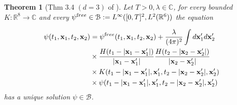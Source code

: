 \documentclass[b5paper,draft,openbib,12pt]{memoir}
\newtheorem{Thm}[Def]{Theorem}
\newcommand{\vx}{\mathbf{x}}
\newcommand{\free}{{\textup free}}
\begin{document}


\begin{Thm}[Thm 3.4 \((d=3)\) of \cite{mtve}]
Let \(T>0, \lambda\in\mathbb{C}\), for every bounded \(K:\mathbb{R}^8\rightarrow\mathbb{C}\) and every
\(\psi^\free \in\mathcal{B}:=L^\infty([0,T]^2,L^2(\mathbb{R}^6))\)
the equation 

\begin{align*}
\psi(t_1,\vx_1,t_2,\vx_2)&=\psi^\free(t_1,\vx_1,t_2,\vx_2)+\frac{\lambda}{(4\pi)^2}\int d\vx_1' d\vx_2'\\
&\times \frac{H(t_1-|\vx_1-\vx_1'|)}{|\vx_1-\vx_1'|}\frac{H(t_2-|\vx_2-\vx_2'|)}{|\vx_2-\vx_2'|}\\
&\times K(t_1-|\vx_1-\vx_1'|,\vx_1',t_2-|\vx_2-\vx_2'|,\vx_2')\\
&\times \psi(t_1-|\vx_1-\vx_1'|,\vx_1',t_2-|\vx_2-\vx_2'|,\vx_2')
\end{align*}
has a unique solution \(\psi\in\mathcal{B}\).
\end{Thm}
\end{document}
